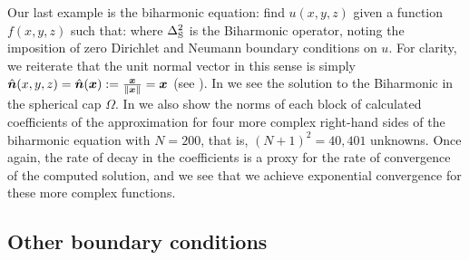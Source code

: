 Our last example is the biharmonic equation: find $u(x,y,z)$ given a function $f(x,y,z)$ such that:
where $\Delta_{\rm S}^2$ is the Biharmonic operator, noting the imposition of zero Dirichlet and Neumann boundary conditions on $u$. For clarity, we reiterate that the unit normal vector in this sense is simply $\hat{\bm{n}}(x,y,z) = \hat{\bm{n}}(\bm{x}) := {\bm{x} \over \left\| \bm{x} \right\|} = \bm{x}$ (see ). In  we see the solution to the Biharmonic  in the spherical cap $\Omega$. In  we also show the norms of each block of calculated coefficients of the approximation for four more complex right-hand sides of the biharmonic equation with $N = 200$, that is, $(N+1)^2 = 40,401$ unknowns. Once again, the rate of decay in the coefficients is a proxy for the rate of convergence of the computed solution, and we see that we achieve exponential convergence for these more complex functions.


\subsection{Other boundary conditions}


